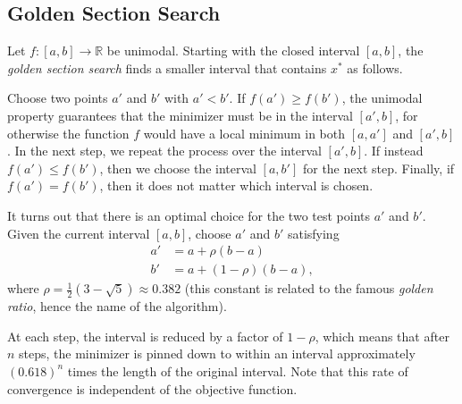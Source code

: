 \subsection*{Golden Section Search} %

Let $f:[a,b]\rightarrow\mathbb{R}$ be unimodal.
Starting with the closed interval $[a,b]$, the \emph{golden section search} finds a smaller interval that contains $x^*$ as follows.

Choose two points $a'$ and $b'$ with $a' < b'$.
If $f(a') \geq f(b')$, the unimodal property guarantees that the minimizer must be in the interval $[a', b]$, for otherwise the function $f$ would have a local minimum in both $[a, a']$ and $[a', b]$. %
In the next step, we repeat the process over the interval $[a', b]$.
If instead $f(a') \leq f(b')$, then we choose the interval $[a, b']$ for the next step.
Finally, if $f(a') = f(b')$, then it does not matter which interval is chosen.

It turns out that there is an optimal choice for the two test points $a'$ and $b'$.
Given the current interval $[a, b]$, choose $a'$ and $b'$ satisfying
\begin{align*}
a' &= a + \rho(b - a) \\
b' &= a + (1 - \rho)(b - a),
\end{align*}
where $\rho = \frac{1}{2}(3 - \sqrt{5}) \approx 0.382$ (this constant is related to the famous \emph{golden ratio}, hence the name of the algorithm).

At each step, the interval is reduced by a factor of $1-\rho$, which means that after $n$ steps, the minimizer is pinned down to within an interval approximately $(0.618)^n$ times the length of the original interval.
Note that this rate of convergence is independent of the objective function.


